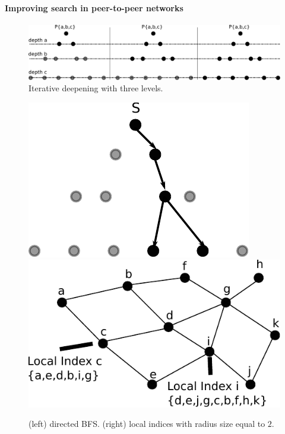 \documentclass[acmcsur,acmnow]{acmtrans2m}
\begin{document}

\paragraph*{\bf Improving search in peer-to-peer networks}

\begin{figure}
\centering
  \includegraphics[scale=0.4]{img/algorithms/iterative_deepening}
\caption{Iterative deepening with three levels.}
\label{fig:iterative_deepening}
\end{figure}

\begin{figure}
\centering
  \includegraphics[scale=0.4]{img/algorithms/directed_bfs}
  \includegraphics[scale=0.4]{img/algorithms/local_indices}
\caption{(left) directed BFS. (right) local indices with radius size equal to $2$.}
\label{fig:directed_bfs}
\end{figure}
\end{document}
